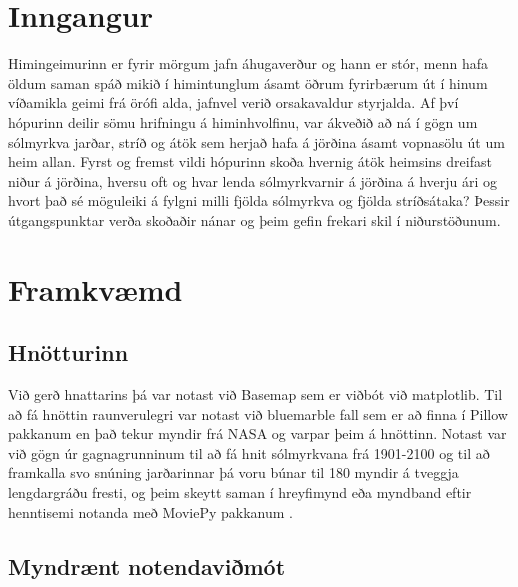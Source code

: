 \documentclass[12pt, git, final]{rureport}
\begin{document}
\maketitle  %


%
\section{Inngangur} %
Himingeimurinn er fyrir mörgum jafn áhugaverður og hann er stór, menn hafa öldum saman spáð mikið í himintunglum ásamt öðrum fyrirbærum út í hinum víðamikla geimi frá örófi alda, jafnvel verið orsakavaldur styrjalda. Af því hópurinn deilir sömu hrifningu á himinhvolfinu, var ákveðið að ná í gögn um sólmyrkva jarðar, stríð og átök sem herjað hafa á jörðina ásamt vopnasölu út um heim allan. Fyrst og fremst vildi hópurinn skoða hvernig átök heimsins dreifast niður á jörðina, hversu oft og hvar lenda sólmyrkvarnir á jörðina á hverju ári og hvort það sé möguleiki á fylgni milli fjölda sólmyrkva og fjölda stríðsátaka? Þessir útgangspunktar verða skoðaðir nánar og þeim gefin frekari skil í niðurstöðunum.  
\section{Framkvæmd}
\subsection{Hnötturinn}
Við gerð hnattarins þá var notast við Basemap sem er viðbót við matplotlib. Til að fá hnöttin raunverulegri var notast við bluemarble fall sem er að finna í Pillow \cite{pillow} pakkanum en það tekur myndir frá NASA \cite{bluemarble} og varpar þeim á hnöttinn. Notast var við gögn úr gagnagrunninum til að fá hnit sólmyrkvana frá 1901-2100 og til að framkalla svo snúning jarðarinnar þá voru búnar til 180 myndir á tveggja lengdargráðu fresti, og þeim skeytt saman í hreyfimynd eða myndband eftir henntisemi notanda með MoviePy pakkanum \cite{moviepy}.
 
\subsection{Myndrænt notendaviðmót}
\end{document}
